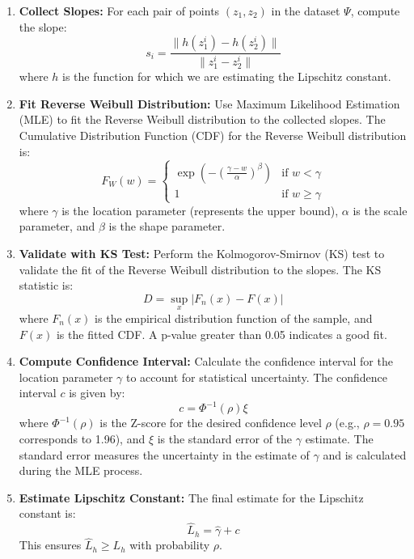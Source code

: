 \documentclass{article}
\begin{document}
\begin{enumerate}
    \item \textbf{Collect Slopes:} For each pair of points \((z_1, z_2)\) in the dataset \(\Psi\), compute the slope:
    \[
    s_i = \frac{\|h(z_1^i) - h(z_2^i)\|}{\|z_1^i - z_2^i\|}
    \]
    where \(h\) is the function for which we are estimating the Lipschitz constant.

    \item \textbf{Fit Reverse Weibull Distribution:} Use Maximum Likelihood Estimation (MLE) to fit the Reverse Weibull distribution to the collected slopes. The Cumulative Distribution Function (CDF) for the Reverse Weibull distribution is:
    \[
    F_W(w) = \begin{cases} 
    \exp \left( - \left( \frac{\gamma - w}{\alpha} \right)^\beta \right) & \text{if } w < \gamma \\
    1 & \text{if } w \geq \gamma 
    \end{cases}
    \]
    where \(\gamma\) is the location parameter (represents the upper bound), \(\alpha\) is the scale parameter, and \(\beta\) is the shape parameter.

    \item \textbf{Validate with KS Test:} Perform the Kolmogorov-Smirnov (KS) test to validate the fit of the Reverse Weibull distribution to the slopes. The KS statistic is:
    \[
    D = \sup_x |F_n(x) - F(x)|
    \]
    where \(F_n(x)\) is the empirical distribution function of the sample, and \(F(x)\) is the fitted CDF. A p-value greater than 0.05 indicates a good fit.

    \item \textbf{Compute Confidence Interval:} Calculate the confidence interval for the location parameter \(\gamma\) to account for statistical uncertainty. The confidence interval \(c\) is given by:
    \[
    c = \Phi^{-1}(\rho) \xi
    \]
    where \(\Phi^{-1}(\rho)\) is the Z-score for the desired confidence level \(\rho\) (e.g., \(\rho = 0.95\) corresponds to 1.96), and \(\xi\) is the standard error of the \(\gamma\) estimate.
    The standard error measures the uncertainty in the estimate of \(\gamma\) and is calculated during the MLE process.
    \item \textbf{Estimate Lipschitz Constant:} The final estimate for the Lipschitz constant is:
    \[
    \hat{L}_h = \hat{\gamma} + c
    \]
    This ensures \(\hat{L}_h \geq L_h\) with probability \(\rho\).
\end{enumerate}
\end{document}
